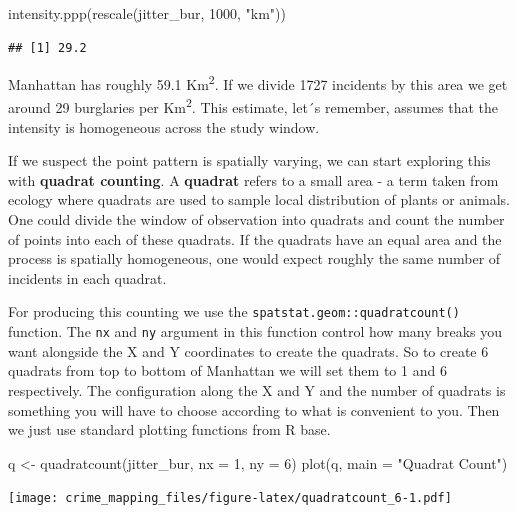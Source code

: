 \documentclass[
  krantz2]{krantz}
\makeatletter
\newenvironment{Shaded}{\begin{snugshade}}{\end{snugshade}}
\newcommand{\AttributeTok}[1]{\textcolor[rgb]{0.61,0.61,0.61}{#1}}
\newcommand{\DecValTok}[1]{\textcolor[rgb]{0.06,0.06,0.06}{#1}}
\newcommand{\FunctionTok}[1]{\textcolor[rgb]{0,0,0}{#1}}
\newcommand{\NormalTok}[1]{#1}
\newcommand{\OtherTok}[1]{\textcolor[rgb]{0.37,0.37,0.37}{#1}}
\newcommand{\StringTok}[1]{\textcolor[rgb]{0.5,0.5,0.5}{#1}}
\newenvironment{kframe}{%
\medskip{}
\setlength{\fboxsep}{.8em}
 \def\at@end@of@kframe{}%
 \ifinner\ifhmode%
  \def\at@end@of@kframe{\end{minipage}}%
  \begin{minipage}{\columnwidth}%
 \fi\fi%
 \def\FrameCommand##1{\hskip\@totalleftmargin \hskip-\fboxsep
 \colorbox{shadecolor}{##1}\hskip-\fboxsep
     \hskip-\linewidth \hskip-\@totalleftmargin \hskip\columnwidth}%
 \MakeFramed {\advance\hsize-\width
   \@totalleftmargin\z@ \linewidth\hsize
   \@setminipage}}%
 {\par\unskip\endMakeFramed%
 \at@end@of@kframe}
\renewenvironment{Shaded}{\begin{kframe}}{\end{kframe}}
\makeatother
\begin{document}
\begin{Shaded}
\begin{Highlighting}[]
\FunctionTok{intensity.ppp}\NormalTok{(}\FunctionTok{rescale}\NormalTok{(jitter\_bur, }\DecValTok{1000}\NormalTok{, }\StringTok{"km"}\NormalTok{))}
\end{Highlighting}
\end{Shaded}

\begin{verbatim}
## [1] 29.2
\end{verbatim}

Manhattan has roughly 59.1 Km\textsuperscript{2}. If we divide 1727 incidents by this area we get around 29 burglaries per Km\textsuperscript{2}. This estimate, let´s remember, assumes that the intensity is homogeneous across the study window.

If we suspect the point pattern is spatially varying, we can start exploring this with \textbf{quadrat counting}. A \textbf{quadrat} refers to a small area - a term taken from ecology where quadrats are used to sample local distribution of plants or animals. One could divide the window of observation into quadrats and count the number of points into each of these quadrats. If the quadrats have an equal area and the process is spatially homogeneous, one would expect roughly the same number of incidents in each quadrat.

For producing this counting we use the \texttt{spatstat.geom::quadratcount()} function. The \texttt{nx} and \texttt{ny} argument in this function control how many breaks you want alongside the X and Y coordinates to create the quadrats. So to create 6 quadrats from top to bottom of Manhattan we will set them to 1 and 6 respectively. The configuration along the X and Y and the number of quadrats is something you will have to choose according to what is convenient to you. Then we just use standard plotting functions from R base.

\begin{Shaded}
\begin{Highlighting}[]
\NormalTok{q }\OtherTok{\textless{}{-}} \FunctionTok{quadratcount}\NormalTok{(jitter\_bur, }\AttributeTok{nx =} \DecValTok{1}\NormalTok{, }\AttributeTok{ny =} \DecValTok{6}\NormalTok{)}
\FunctionTok{plot}\NormalTok{(q, }\AttributeTok{main =} \StringTok{"Quadrat Count"}\NormalTok{)}
\end{Highlighting}
\end{Shaded}

\texttt{[image: crime\_mapping\_files/figure-latex/quadratcount\_6-1.pdf]}
\end{document}
